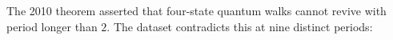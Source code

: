 The 2010 theorem asserted that four-state quantum walks cannot revive
with period longer than $2$. The dataset contradicts this at nine
distinct periods:
